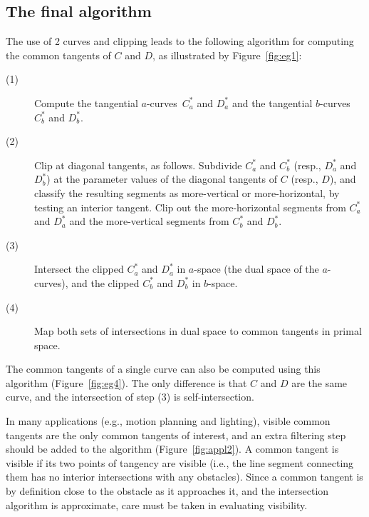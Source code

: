 \documentclass[10pt,twocolumn]{article}
\newcommand{\atangs}{tangential $a$-curves\ }
\newcommand{\btangs}{tangential $b$-curves\ }
\begin{document}
\subsection{The final algorithm}

The use of 2 curves and clipping leads to the following algorithm
for computing the common tangents of $C$ and $D$, 
as illustrated by Figure~\ref{fig:eg1}:
\begin{description}
\item[(1)]	Compute the \atangs $C_a^*$ and $D_a^*$ 
		and the \btangs $C_b^*$ and $D_b^*$.
\item[(2)]  	Clip at diagonal tangents, as follows.
		Subdivide $C_a^*$ and $C_b^*$ (resp., $D_a^*$ and $D_b^*$)
		at the parameter values of the
		diagonal tangents of $C$ (resp., $D$),
		and classify the resulting segments
		as more-vertical or more-horizontal,
		by testing an interior tangent. %
		Clip out the more-horizontal segments from $C_a^*$ and $D_a^*$
		and the more-vertical segments from $C_b^*$ and $D_b^*$.
\item[(3)] 	Intersect the clipped $C_a^*$ and $D_a^*$ in $a$-space
		(the dual space of the $a$-curves),
		and the clipped $C_b^*$ and $D_b^*$ in $b$-space.
\item[(4)]	Map both sets of intersections in dual space to 
		common tangents in primal space.
\end{description}

The common tangents of a single curve can also be computed using this algorithm
(Figure~\ref{fig:eg4}).
The only difference is that $C$ and $D$ are the same curve,
and the intersection of step (3) is self-intersection.

In many applications (e.g., motion planning and lighting),
visible common tangents are the only common tangents of interest,
and an extra filtering step should be added to the algorithm (Figure~\ref{fig:appl2}).
A common tangent is visible if its two points of tangency
are visible (i.e., the line segment connecting them
has no interior intersections with any obstacles).
Since a common tangent is by definition close to the 
obstacle as it approaches it, and the intersection algorithm is approximate,
care must be taken in evaluating visibility.
\end{document}
